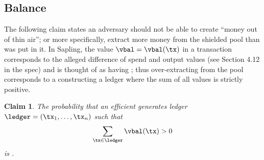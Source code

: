 \documentclass[11pt]{article}
\numberwithin{equation}{section} %
\numberwithin{figure}{section} %
\newtheorem{claim}[thm]{Claim}
\begin{document}
\subsection{Balance}
The following claim states an adversary should not be able to create ``money out of thin air'';
or more specifically, extract more money from the shielded pool than was put in it.
In Sapling, the value $\vbal=\vbal(\tx)$ in a transaction \tx corresponds to the alleged difference of spend and output values (see Section 4.12 in the spec) and \tx is thought of as having  ;
thus over-extracting from the pool corresponds to a constructing a ledger where the sum of all \vbal values is strictly positive.
\begin{claim}\label{clm:balance-sapling}
 The probability that an efficient \adv generates ledger $\ledger=(\tx_1,\ldots,\tx_n)$ such that
 \[\sum_{\tx\in \ledger} \vbal(\tx) >0 \]
 is \negl.
\end{claim}
\end{document}
